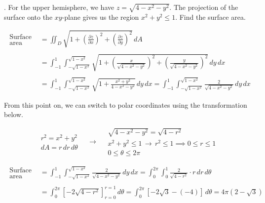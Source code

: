 \documentclass{article}
\begin{document}
\hfill

. For the upper hemisphere, we have $z=\sqrt{4-x^2-y^2}$. The projection of the surface onto the $xy$-plane gives us the region $x^2+y^2\leq1$. Find the surface area.

\begin{align*}
\begin{array}{c}
\text{Surface}\\\text{area}
\end{array}&=\iint_D\sqrt{1+\left(\frac{\partial z}{\partial x}\right)^2+\left(\frac{\partial z}{\partial y}\right)^2}\,dA\\\\&=\int_{-1}^1\int_{-\sqrt{1-x^2}}^{\sqrt{1-x^2}}\sqrt{1+\left(\frac{x}{\sqrt{4-x^2-y^2}}\right)^2+\left(\frac{y}{\sqrt{4-x^2-y^2}}\right)^2}\,dy\,dx\\\\&=\int_{-1}^1\int_{-\sqrt{1-x^2}}^{\sqrt{1-x^2}}\sqrt{1+\frac{x^2+y^2}{4-x^2-y^2}}\,dy\,dx=\int_{-1}^1\int_{-\sqrt{1-x^2}}^{\sqrt{1-x^2}}\frac2{\sqrt{4-x^2-y^2}}\,dy\,dx\end{align*}

\newpage

\noindent From this point on, we can switch to polar coordinates using the transformation below.

\[
\begin{array}{c}
r^2=x^2+y^2\\
dA=r\,dr\,d\theta
\end{array}\quad\rightarrow\quad
\begin{array}{c}
\sqrt{4-x^2-y^2}=\sqrt{4-r^2}\\[0.3cm]
x^2+y^2\leq1\,\rightarrow\,r^2\leq1\implies0\leq r\leq1\\[0.3cm]
0\leq\theta\leq2\pi
\end{array}
\]

\begin{align*}
\begin{array}{c}
\text{Surface}\\\text{area}
\end{array}&=\int_{-1}^1\int_{-\sqrt{1-x^2}}^{\sqrt{1-x^2}}\frac2{\sqrt{4-x^2-y^2}}\,dy\,dx=\int_0^{2\pi}\int_0^1\frac2{\sqrt{4-r^2}}\cdot r\,dr\,d\theta\\\\&=\int_0^{2\pi}\left[-2\sqrt{4-r^2}\right]_{r=0}^{r=1}\,d\theta=\int_0^{2\pi}\left[-2\sqrt3-\left(-4\right)\right]\,d\theta=\boxed{4\pi\left(2-\sqrt3\right)}\end{align*}
\end{document}
